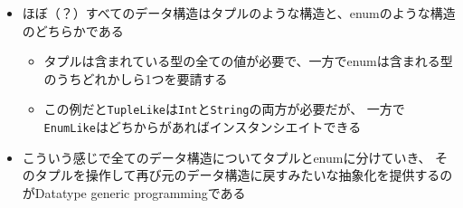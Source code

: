 \begin{frame}[fragile]
{\begin{itemize}
      \item ほぼ（？）すべてのデータ構造はタプルのような構造と、enumのような構造のどちらかである
      \begin{itemize}
        \item タプルは含まれている型の全ての値が必要で、一方でenumは含まれる型のうちどれかしら1つを要請する
        \item この例だと\lstinline|TupleLike|は\lstinline|Int|と\lstinline|String|の両方が必要だが、
        一方で\lstinline|EnumLike|はどちからがあればインスタンシエイトできる
      \end{itemize}

      \item こういう感じで全てのデータ構造についてタプルとenumに分けていき、
      そのタプルを操作して再び元のデータ構造に戻すみたいな抽象化を提供するのがDatatype generic programmingである
    \end{itemize}
  }
\end{frame}

